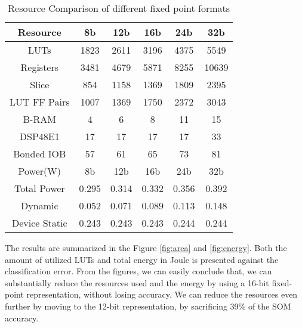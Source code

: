 \begin{table}[h!]
	\centering
	\caption{Resource Comparison of different fixed point formats}
	\label{table:1}
	\begin{tabular}{ c |c | c| c |c | c } 
		\toprule
		Resource & 8b & 12b & 16b & 24b & 32b \\ 
		\midrule
		LUTs & 1823 & 2611 &3196 & 4375 & 5549 \\
		\hline
		Registers & 3481 & 4679 & 5871 & 8255 & 10639 \\ 
		\hline
		Slice & 854 & 1158 & 1369 &1809 & 2395 \\ 
		\hline
		LUT FF Pairs & 1007 & 1369 & 1750 & 2372 & 3043 \\
		\hline
		B-RAM & 4 & 6 & 8 & 11 & 15 \\
		\hline
		DSP48E1 & 17 & 17 & 17 & 17 & 33 \\
		\hline
		Bonded IOB & 57 & 61 & 65 & 73 & 81 \\
		\midrule
	
		\midrule
		Power(W) & 8b & 12b & 16b & 24b & 32b \\ 
		\midrule
		Total Power & 0.295 &0.314 &0.332 &0.356 &0.392 \\
		\hline
		Dynamic &0.052 &0.071 &0.089 &0.113 &0.148 \\ 
		\hline
		Device Static &0.243 &0.243 &0.243 &0.244 &0.244 \\ 
		\bottomrule
	\end{tabular}
\end{table}
The results are summarized in the Figure \ref{fig:area} and \ref{fig:energy}. Both the amount of utilized LUTs and total energy in Joule is presented against the classification error. From the figures, we can easily conclude that, we can substantially reduce the resources used and the energy by using a 16-bit fixed-point representation, without losing accuracy. We can reduce the resources even further by moving to the 12-bit representation, by sacrificing 39\% of the SOM accuracy. 
